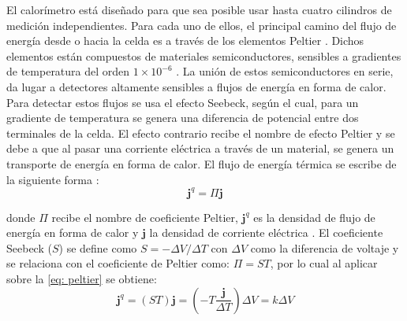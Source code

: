 	El calor\'imetro est\'a dise\~nado para que sea posible usar hasta cuatro cilindros de medici\'on independientes. Para cada uno de ellos, el principal camino del flujo de energ\'ia desde o hacia la celda es a trav\'es de los elementos Peltier \cite{Suurkuusk}. Dichos elementos est\'an compuestos de materiales semiconductores, sensibles a gradientes de temperatura del orden $1\times10^{-6}$ \grad{} \cite{Suurkuusk, simon2013oxford}. La uni\'on de estos semiconductores en serie, da lugar a detectores altamente sensibles a flujos de energ\'ia en forma de calor. Para detectar estos flujos se usa el efecto Seebeck, seg\'un el cual, para un gradiente de temperatura se genera una diferencia de potencial entre dos terminales de la celda. El efecto contrario recibe el nombre de efecto Peltier y se debe a que al pasar una corriente el\'ectrica a trav\'es de un material, se genera un transporte de energ\'ia en forma de calor. El flujo de energ\'ia t\'ermica se escribe de la siguiente forma \cite{simon2013oxford}:
	\begin{equation}\label{eq: peltier}
		\mathbf{j}^q = \Pi \mathbf{j}
	\end{equation}
	
	donde $\Pi$ recibe el nombre de coeficiente Peltier, $\mathbf{j}^q$ es la densidad de flujo de energ\'ia en forma de calor y $\mathbf{j}$ la densidad de corriente el\'ectrica \cite{simon2013oxford}. El coeficiente Seebeck ($S$) se define como $S = -\Delta V/\Delta T$ con $\Delta V$ como la diferencia de voltaje y se relaciona con el coeficiente de Peltier como: $\Pi = ST$, por lo cual al aplicar sobre la \autoref{eq: peltier} se obtiene:
	\begin{equation}\label{eq: seebeck}
		\mathbf{j}^q = (ST) \mathbf{j} = \left(-T\dfrac{\mathbf{j}}{\Delta T}\right)\Delta V = k\Delta V
	\end{equation}
	

